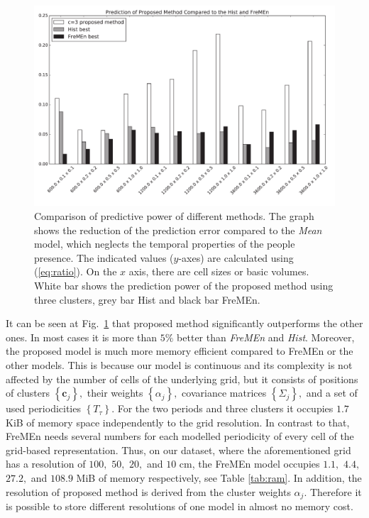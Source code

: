 \begin{figure}
\begin{center}
    \includegraphics[width=0.7\columnwidth]{fig/ours3_hist_fremen.pdf}
    \caption{Comparison of predictive power of different methods. 
The graph shows the reduction of the prediction error compared to the \textit{Mean} model, which neglects the temporal properties of the people presence.
The indicated values ($y$-axes) are calculated using (\ref{eq:ratio}). 
On the $x$ axis, there are cell sizes or basic volumes.
White bar shows the prediction power of the proposed method using three clusters, grey bar Hist and black bar FreMEn.\label{graph:pedestrians}}
\end{center}
\end{figure}

It can be seen at Fig.~\ref{graph:pedestrians} that proposed method significantly outperforms the other ones. 
In most cases it is more than $5\%$ better than \textit{FreMEn} and \textit{Hist}.
Moreover, the proposed model is much more memory efficient compared to FreMEn or the other models.
This is because our model is continuous and its complexity is not affected by the number of cells of the underlying grid, but it consists of positions of clusters $\left\{\mathbf{c}_{j}\right\},$ their weights $\left\{\alpha_{j}\right\},$ covariance matrices $\left\{\Sigma_{j}\right\},$ and a set of used periodicities $\left\{T_{\tau}\right\}$. 
For the two periods and three clusters it occupies $1.7$ KiB of memory space independently to the grid resolution.
In contrast to that, FreMEn needs several numbers for each modelled periodicity of every cell of the grid-based representation.
Thus, on our dataset, where the aforementioned grid has a resolution of $100,$ $50,$ $20,$ and $10$ cm, the FreMEn model occupies $1.1,$ $4.4,$ $27.2,$ and $108.9$ MiB of memory respectively, see Table \ref{tab:ram}.
In addition, the resolution of proposed method is derived from the cluster weights $\alpha_j.$ 
Therefore it is possible to store different resolutions of one model in almost no memory cost.

